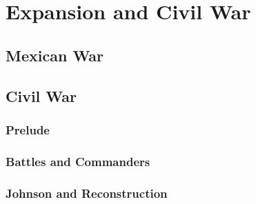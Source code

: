 \chapter{Expansion and Civil War}

\section{Mexican War}


\section{Civil War}

\subsection*{Prelude}

\subsection*{Battles and Commanders}

\subsection*{Johnson and Reconstruction}
